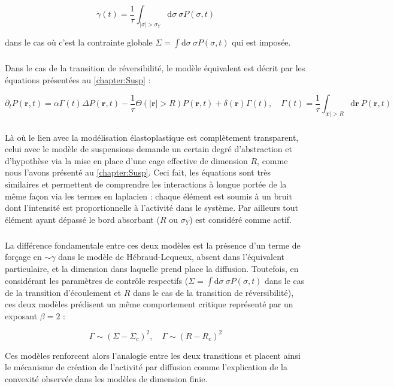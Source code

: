 \begin{equation}
	\dot{\gamma} (t) = \frac{1}{\tau}\int_{|\sigma|>\sigma_Y}\mathrm{d}\sigma ~ \sigma P(\sigma, t)
\end{equation}

\noindent dans le cas où c'est la contrainte globale $\Sigma = \int \mathrm{d}\sigma ~ \sigma P(\sigma,t)$ qui est imposée.

\subparagraph{}Dans le cas de la transition de réversibilité, le modèle équivalent est décrit par les équations présentées au \autoref{chapter:Susp} :

\begin{equation}
    \partial_t P(\mathbf{r}, t) = \alpha\Gamma (t)\Delta P(\mathbf{r}, t) - \frac{1}{\tau}\Theta(|\mathbf{r}|>R)P(\mathbf{r}, t) + \delta(\mathbf{r})\Gamma (t), \quad \Gamma (t) = \frac{1}{\tau}\int_{|\mathbf{r}|>R}\mathrm{d}\mathbf{r}~P(\mathbf{r}, t)
    \label{eq:muHLDiff}
\end{equation} 

\subparagraph{}Là où le lien avec la modélisation élastoplastique est complètement transparent, celui avec le modèle de suspensions demande un certain degré d'abstraction et d'hypothèse via la mise en place d'une cage effective de dimension $R$, comme nous l'avons présenté au \autoref{chapter:Susp}. Ceci fait, les équations sont très similaires et permettent de comprendre les interactions à longue portée de la même façon via les termes en laplacien : chaque élément est soumis à un bruit dont l'intensité est proportionnelle à l'activité dans le système. Par ailleurs tout élément ayant dépassé le bord absorbant ($R$ ou $\sigma_Y$) est considéré comme actif.

\subparagraph{}La différence fondamentale entre ces deux modèles est la présence d'un terme de forçage en $\sim \dot{\gamma}$ dans le modèle de Hébraud-Lequeux, absent dans l'équivalent particulaire, et la dimension dans laquelle prend place la diffusion. Toutefois, en considérant les paramètres de contrôle respectifs ($\Sigma = \int \mathrm{d}\sigma ~ \sigma P(\sigma,t)$ dans le cas de la transition d'écoulement et $R$ dans le cas de la transition de réversibilité), ces deux modèles prédisent un même comportement critique représenté par un exposant $\beta = 2$ :

\begin{equation}
	\Gamma \sim (\Sigma - \Sigma_c)^2,\quad \Gamma \sim (R-R_c)^2
\end{equation}

\noindent Ces modèles renforcent alors l'analogie entre les deux transitions et placent ainsi le mécanisme de création de l'activité par diffusion comme l'explication de la convexité observée dans les modèles de dimension finie.

